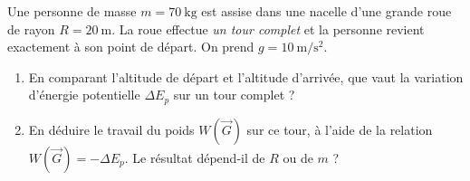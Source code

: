 \documentclass[11pt,a4paper]{article}
\newcommand{\vv}[1]{\vec{#1}}\newcommand{\ds}{\displaystyle}
\begin{document}

\begin{exo}
Une personne de masse $m=\qty{70}{\kilogram}$ est assise dans une nacelle d'une grande roue de rayon
$R=\qty{20}{\metre}$. La roue effectue \emph{un tour complet} et la personne revient exactement à son
point de départ. On prend $g=\qty{10}{\metre\per\second\squared}$.
\begin{center}
\end{center}
\begin{enumerate}[label=\alph*)]
  \item En comparant l'altitude de départ et l'altitude d'arrivée, que vaut la variation d'énergie
        potentielle $\Delta E_p$ sur un tour complet ?
  \item En déduire le travail du poids $W(\vv G)$ sur ce tour, à l'aide de la relation
        $W(\vv G)=-\Delta E_p$. Le résultat dépend-il de $R$ ou de $m$ ?
\end{enumerate}
\end{exo}
\end{document}
